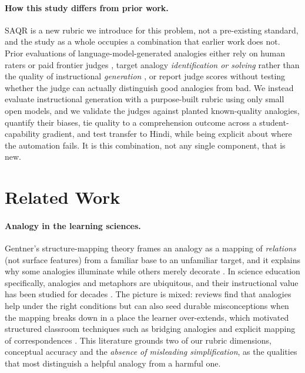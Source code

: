 \documentclass[11pt]{article}
\begin{document}
\paragraph{How this study differs from prior work.} SAQR is a new rubric we introduce for this
problem, not a pre-existing standard, and the study as a whole occupies a combination that earlier
work does not. Prior evaluations of language-model-generated analogies either rely on human raters or
paid frontier judges \citep{shao2025unlocking,zheng2023judging}, target analogy \emph{identification
or solving} rather than the quality of instructional \emph{generation}
\citep{jiayang2023storyanalogy,ye2024analobench}, or report judge scores without testing whether the
judge can actually distinguish good analogies from bad. We instead evaluate instructional generation
with a purpose-built rubric using only small open models, and we validate the judges against planted
known-quality analogies, quantify their biases, tie quality to a comprehension outcome across a
student-capability gradient, and test transfer to Hindi, while being explicit about where the
automation fails. It is this combination, not any single component, that is new.

\section{Related Work}
\label{sec:related}

\paragraph{Analogy in the learning sciences.}
Gentner's structure-mapping theory frames an analogy as a mapping of \emph{relations}
(not surface features) from a familiar base to an unfamiliar target, and it explains
why some analogies illuminate while others merely decorate \citep{gentner1983structure}.
In science education specifically, analogies and metaphors are ubiquitous, and their
instructional value has been studied for decades \citep{duit1991role}. The picture is
mixed: reviews find that analogies help under the right conditions but can also seed
durable misconceptions when the mapping breaks down in a place the learner over-extends,
which motivated structured classroom techniques such as bridging analogies and explicit
mapping of correspondences \citep{dagher1995review,clement1993bridging}. This literature
grounds two of our rubric dimensions, conceptual accuracy and the \emph{absence of
misleading simplification}, as the qualities that most distinguish a helpful analogy
from a harmful one.
\end{document}

